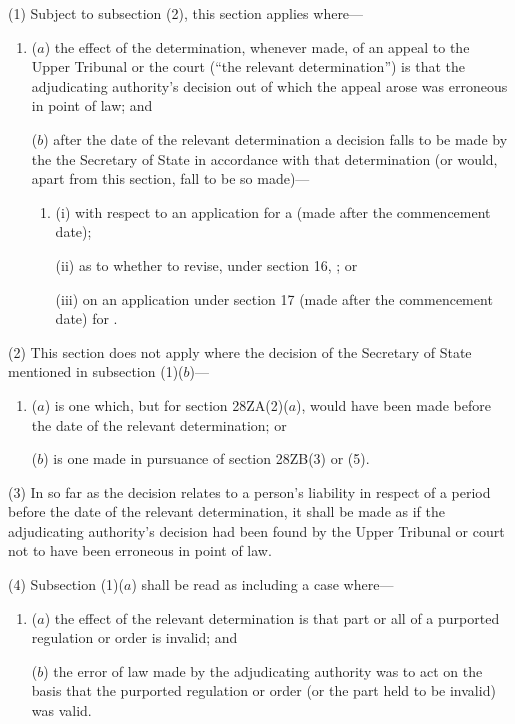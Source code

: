\documentclass[12pt,a4paper]{article}
\begin{document}
(1) Subject to subsection (2), this section applies where---
\begin{enumerate}\item[]
($a$) the effect of the determination, whenever made, of an appeal to the Upper
Tribunal or the court (“the relevant determination”) is that the adjudicating
authority’s decision out of which the appeal arose was erroneous in point of
law; and

($b$) after the date of the relevant determination a decision falls to be made by the
the Secretary of State in accordance with that determination (or would,
apart from this section, fall to be so made)---
\begin{enumerate}\item[]
(i) with respect to an application for a  (made after the commencement date);

(ii) as to whether to revise, under section 16, ; or

(iii) on an application under section 17 (made after the commencement date) for .
\end{enumerate}
\end{enumerate}

(2) This section does not apply where the decision of the Secretary of State mentioned in subsection (1)($b$)---
\begin{enumerate}\item[]
($a$) is one which, but for section 28ZA(2)($a$), would have been made before the date of the relevant determination; or

($b$) is one made in pursuance of section 28ZB(3) or (5).
\end{enumerate}

(3)
In so far as the decision relates to a person’s liability in respect of a period before the date of the relevant determination, it shall be made as if the adjudicating authority’s decision had been found by the Upper Tribunal or court not to have been erroneous in point of law.

(4)
Subsection (1)($a$) shall be read as including a case where---
\begin{enumerate}\item[]
($a$) the effect of the relevant determination is that part or all of a purported regulation or order is invalid; and

($b$) the error of law made by the adjudicating authority was to act on the basis that the purported regulation or order (or the part held to be invalid) was valid.
\end{enumerate}
\end{document}
